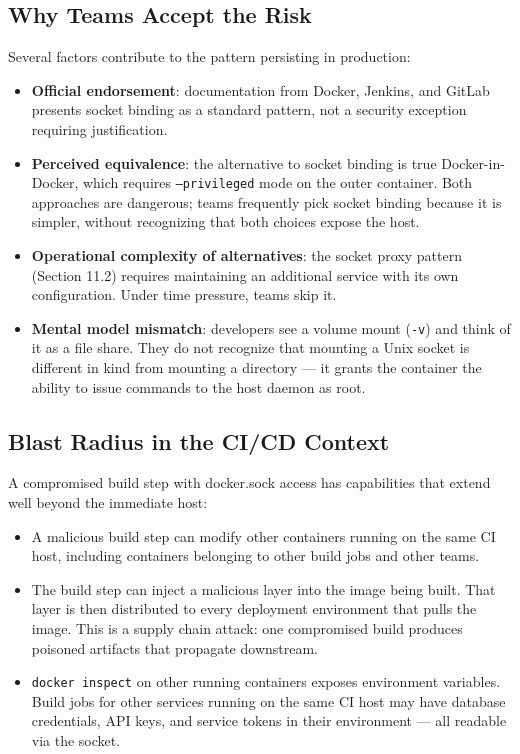 \subsection{Why Teams Accept the Risk}

Several factors contribute to the pattern persisting in production:

\begin{itemize}
    \item \textbf{Official endorsement}: documentation from Docker, Jenkins, and GitLab presents socket binding as a standard pattern, not a security exception requiring justification.
    \item \textbf{Perceived equivalence}: the alternative to socket binding is true Docker-in-Docker, which requires \texttt{--privileged} mode on the outer container. Both approaches are dangerous; teams frequently pick socket binding because it is simpler, without recognizing that both choices expose the host.
    \item \textbf{Operational complexity of alternatives}: the socket proxy pattern (Section 11.2) requires maintaining an additional service with its own configuration. Under time pressure, teams skip it.
    \item \textbf{Mental model mismatch}: developers see a volume mount (\texttt{-v}) and think of it as a file share. They do not recognize that mounting a Unix socket is different in kind from mounting a directory --- it grants the container the ability to issue commands to the host daemon as root.
\end{itemize}

\subsection{Blast Radius in the CI/CD Context}

A compromised build step with docker.sock access has capabilities that extend well beyond the immediate host:

\begin{itemize}
    \item A malicious build step can modify other containers running on the same CI host, including containers belonging to other build jobs and other teams.
    \item The build step can inject a malicious layer into the image being built. That layer is then distributed to every deployment environment that pulls the image. This is a supply chain attack: one compromised build produces poisoned artifacts that propagate downstream.
    \item \texttt{docker inspect} on other running containers exposes environment variables. Build jobs for other services running on the same CI host may have database credentials, API keys, and service tokens in their environment --- all readable via the socket.
\end{itemize}

